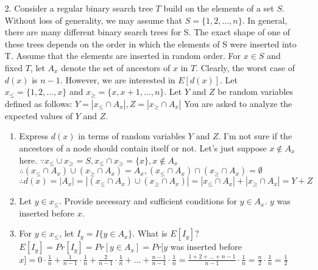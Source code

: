 \documentclass{article}       %
\begin{document}
\begin{enumerate}
\begin{enumerate}
\begin{algorithm}[H]
\begin{algorithmic}[1]
        			\EndProcedure
        		\end{algorithmic}\label{p1}
        	\end{algorithm}	
        \end{enumerate}
     \item[2.] Consider a regular binary search tree $T$ build on the elements of a set $S$. Without loss of generality, we may assume that $S = \{1,2, ..., n\}$. In general, there are many different binary search trees for S. The exact shape of one of these trees depends on the order in which the elements of S were inserted into T. Assume that the elements are inserted in random order. For $x \in S$ and fixed $T$, let $A_x$ denote the set of ancestors of $x$ in $T$. Clearly, the worst case of $d(x)$ is $n-1$. However, we are interested in $E[d(x)]$. Let $x _{\leq} = \{1,2, ..., x\}$ and $x_{\geq} = \{x,x+1, ..., n\}$. Let $Y$ and $Z$ be random variables defined as follows:\newline
     $Y = |x_{\leq} \cap A_x|, Z = |x_{\geq} \cap A_x|$\newline
 	You are asked to analyze the expected values of $Y$ and $Z$.
	\begin{enumerate}
		\item Express $d(x)$ in terms of random variables $Y$ and $Z$.\newline\newline
		I'm not sure if the ancestors of a node should contain itself or not. Let's just suppose $x \notin A_x$ here.\newline 
		$\because x_{\leq} \cup x_{\geq}  = S, x_{\leq} \cap x_{\geq}  = \{x\}, x \notin A_x$\newline
		$\therefore (x_{\leq} \cap A_x) \cup (x_{\geq} \cap A_x) = A_x, (x_{\leq} \cap A_x) \cap (x_{\geq} \cap A_x) = \emptyset$\newline
		$\therefore d(x) = |A_x| = |(x_{\leq} \cap A_x) \cup (x_{\geq} \cap A_x)| = |x_{\leq} \cap A_x| + |x_{\geq} \cap A_x| = Y + Z$\newline
		\item Let $y \in x_{\leq}$. Provide necessary and sufficient conditions for $y \in A_x$.\newline\newline
		$y$ was inserted before $x$.\newline
		\item For $y \in x_{\leq}$, let $I_y = I\{y\in A_x\}$. What is $E[I_y]$?\newline\newline
		$E[I_y] = Pr[I_y] = Pr[y\in A_x] = Pr[y$ was inserted before $x] = 0 \cdot \frac{1}{n} + \frac{1}{n-1} \cdot \frac{1}{n} + \frac{2}{n-1} \cdot \frac{1}{n} + ... +\frac{n-1}{n-1} \cdot \frac{1}{n}  = \frac{1+2+...+n-1}{n-1}\cdot \frac{1}{n} = \frac{n}{2} \cdot \frac{1}{n} = \frac{1}{2}$\newline

\end{enumerate}
\end{enumerate}
\end{document}

